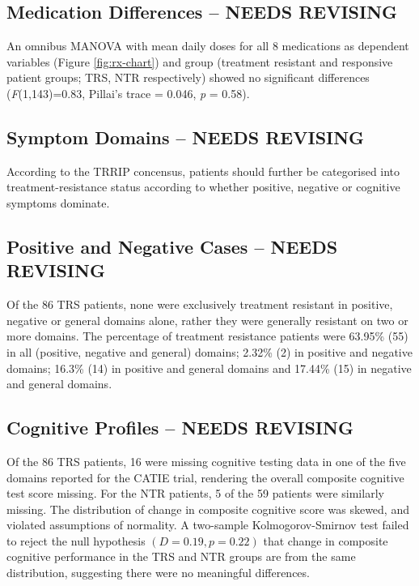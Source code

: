 \documentclass[a4paper,nobib]{article}
\begin{document}
\subsection{Medication Differences -- NEEDS REVISING}
An omnibus MANOVA with mean daily doses for all 8 medications as dependent variables (Figure \ref{fig:rx-chart}) and group (treatment resistant and responsive patient groups; TRS, NTR respectively) showed no significant differences (\emph{F}(1,143)=0.83, Pillai's trace = 0.046, \emph{p} = 0.58). 

\subsection{Symptom Domains -- NEEDS REVISING}
According to the TRRIP concensus, patients should further be categorised into treatment-resistance status according to whether positive, negative or cognitive symptoms dominate.    

\subsection*{Positive and Negative Cases -- NEEDS REVISING}
Of the 86 TRS patients, none were exclusively treatment resistant in positive, negative or general domains alone, rather they were generally resistant on two or more domains.  The percentage of treatment resistance patients were 63.95\% (55) in all (positive, negative and general) domains; 2.32\% (2) in positive and negative domains; 16.3\% (14) in positive and general domains and 17.44\% (15) in negative and general domains. 

\subsection*{Cognitive Profiles -- NEEDS REVISING}
Of the 86 TRS patients, 16 were missing cognitive testing data in one of the five domains reported for the CATIE trial, rendering the overall composite cognitive test score missing.  For the NTR patients, 5 of the 59 patients were similarly missing. The distribution of change in composite cognitive score was skewed, and violated assumptions of normality.  A two-sample Kolmogorov-Smirnov test failed to reject the null hypothesis $(D = 0.19, p = 0.22)$ that change in composite cognitive performance in the TRS and NTR groups are from the same distribution, suggesting there were no meaningful differences. 
\end{document}
